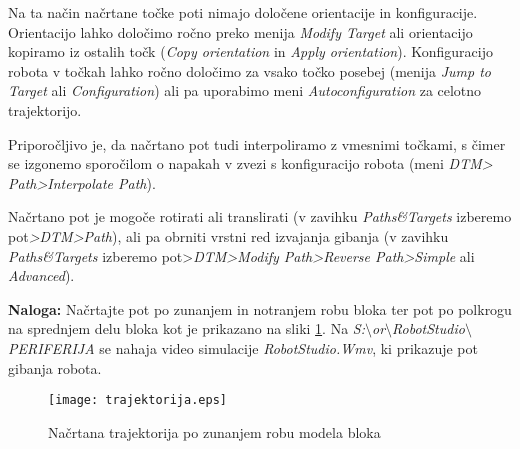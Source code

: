 \begin{enumerate}
\begin{enumerate}
 \end{enumerate}
\end{enumerate}
\vspace{0.3cm}
 \noindent Na ta način načrtane točke poti nimajo
določene orientacije in konfiguracije. Orientacijo lahko določimo
ročno preko menija \emph{Modify Target} ali orientacijo kopiramo iz
ostalih točk (\emph{Copy orientation} in \emph{Apply orientation}).
Konfiguracijo robota v točkah lahko ročno določimo za vsako točko
posebej (menija \emph{Jump to Target} ali \emph{Configuration}) ali
pa uporabimo meni \emph{Autoconfiguration} za celotno trajektorijo.

\vspace{0.3cm} \noindent Priporočljivo je, da načrtano pot tudi
interpoliramo z vmesnimi točkami, s čimer se izgonemo sporočilom o
napakah v zvezi s konfiguracijo robota (meni \emph{DTM>
Path>Interpolate Path}).

\vspace{0.3cm} \noindent Načrtano pot je mogoče rotirati ali translirati (v
zavihku \emph{Paths\&Targets} izberemo pot\emph{>DTM>Path}), ali pa obrniti
vrstni red izvajanja gibanja  (v zavihku \emph{Paths\&Targets} izberemo
pot>\emph{DTM>Modify Path>Reverse Path>Simple} ali \emph{Advanced}).

\vspace{0.3cm}
 \noindent \textbf{Naloga:} Načrtajte pot po
zunanjem in notranjem robu bloka ter pot po polkrogu na sprednjem delu bloka kot je prikazano na sliki \ref{fig:trajektorije}. Na \emph{S:$\setminus$or$\setminus$RobotStudio$\setminus$PERIFERIJA} se nahaja video simulacije \emph{RobotStudio.Wmv}, ki prikazuje pot gibanja robota.

\begin{figure}[h]
\centering
\texttt{[image: trajektorija.eps]}
  \caption{\label{fig:trajektorije} Načrtana trajektorija po zunanjem robu modela bloka}
\end{figure}

